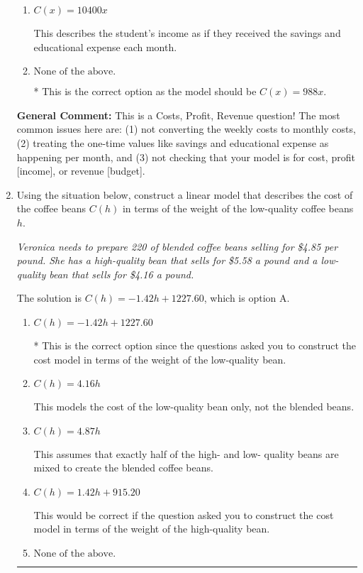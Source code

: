 \documentclass{extbook}[14pt]
\newcommand{\litem}[1]{\item #1

\rule{\textwidth}{0.4pt}}
\begin{document}
\begin{enumerate}
{\begin{enumerate}[label=\Alph*.]
This treats weekly expenses as month expenses rather than multiplying each weekly expense by 4 AND does not account for these expenses per month.
\item \( C(x) = 10400 x \)

This describes the student's income as if they received the savings and educational expense each month.
\item \( \text{None of the above.} \)

* This is the correct option as the model should be $C(x) = 988 x$.
\end{enumerate}

\textbf{General Comment:} This is a Costs, Profit, Revenue question! The most common issues here are: (1) not converting the weekly costs to monthly costs, (2) treating the one-time values like savings and educational expense as happening per month, and (3) not checking that your model is for cost, profit [income], or revenue [budget].
}
\litem{
Using the situation below, construct a linear model that describes the cost of the coffee beans $C(h)$ in terms of the weight of the low-quality coffee beans $h$.

\begin{center}
    \textit{ Veronica needs to prepare 220 of blended coffee beans selling for \$4.85 per pound. She has a high-quality bean that sells for \$5.58 a pound and a low-quality bean that sells for \$4.16 a pound. }
\end{center}
The solution is \( C(h) = -1.42 h + 1227.60 \), which is option A.\begin{enumerate}[label=\Alph*.]
\item \( C(h) = -1.42 h + 1227.60 \)

* This is the correct option since the questions asked you to construct the cost model in terms of the weight of the low-quality bean.
\item \( C(h) = 4.16 h \)

This models the cost of the low-quality bean only, not the blended beans.
\item \( C(h) = 4.87 h \)

This assumes that exactly half of the high- and low- quality beans are mixed to create the blended coffee beans.
\item \( C(h) = 1.42 h + 915.20 \)

This would be correct if the question asked you to construct the cost model in terms of the weight of the high-quality bean.
\item \( \text{None of the above.} \)


\end{enumerate}}
\end{enumerate}
\end{document}
